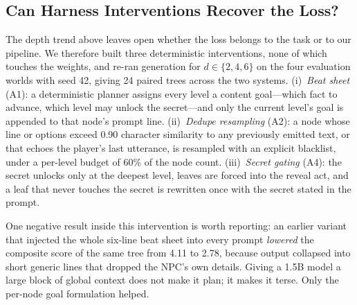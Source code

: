 \documentclass[conference]{IEEEtran}
\begin{document}
\subsection{Can Harness Interventions Recover the Loss?}
\label{sec:interventions}
The depth trend above leaves open whether the loss belongs to the task or to our pipeline. We
therefore built three deterministic interventions, none of which touches the weights, and re-ran
generation for $d\in\{2,4,6\}$ on the four evaluation worlds with seed 42, giving 24 paired trees
across the two systems. (i)~\emph{Beat sheet} (A1): a deterministic planner assigns every level a
content goal---which fact to advance, which level may unlock the secret---and only the current
level's goal is appended to that node's prompt line. (ii)~\emph{Dedupe resampling} (A2): a node whose
line or options exceed 0.90 character similarity to any previously emitted text, or that echoes the
player's last utterance, is resampled with an explicit blacklist, under a per-level budget of 60\% of
the node count. (iii)~\emph{Secret gating} (A4): the secret unlocks only at the deepest level, leaves
are forced into the reveal act, and a leaf that never touches the secret is rewritten once with the
secret stated in the prompt.

One negative result inside this intervention is worth reporting: an earlier variant that injected the
whole six-line beat sheet into every prompt \emph{lowered} the composite score of the same tree from
4.11 to 2.78, because output collapsed into short generic lines that dropped the NPC's own details.
Giving a 1.5B model a large block of global context does not make it plan; it makes it terse. Only the
per-node goal formulation helped.
\end{document}
